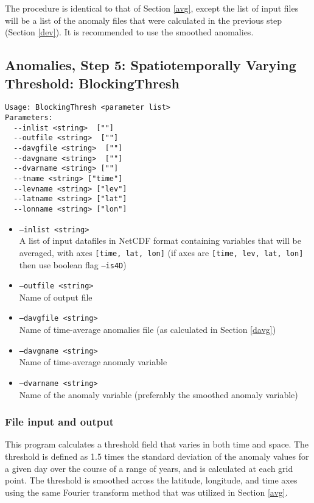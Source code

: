 \documentclass{article}
\begin{document}
The procedure is identical to that of Section \ref{avg}, except the list of input files will be a list of the anomaly files that were calculated in the previous step (Section \ref{dev}). It is recommended to use the smoothed anomalies.

\subsection{Anomalies, Step 5: Spatiotemporally Varying Threshold: BlockingThresh}\label{thresh}

\begin{verbatim}
Usage: BlockingThresh <parameter list>
Parameters:
  --inlist <string>  [""]
  --outfile <string>  [""]
  --davgfile <string>  [""]
  --davgname <string>  [""]
  --dvarname <string> [""]
  --tname <string> ["time"]
  --levname <string> ["lev"]
  --latname <string> ["lat"]
  --lonname <string> ["lon"]
\end{verbatim}

\begin{itemize}
\item[]\texttt{--inlist <string>} \\ A list of input datafiles in NetCDF format containing variables that will be averaged, with axes \texttt{[time, lat, lon]} (if axes are \texttt{[time, lev, lat, lon] } then use boolean flag \texttt{--is4D})
\item[]\texttt{--outfile <string>} \\ Name of output file
\item[]\texttt{--davgfile <string>} \\ Name of time-average anomalies file (as calculated in Section \ref{davg})
\item[]\texttt{--davgname <string>} \\ Name of time-average anomaly variable
\item[]\texttt{--dvarname <string>} \\ Name of the anomaly variable (preferably the smoothed anomaly variable)
\end{itemize}

\subsubsection{File input and output}
This program calculates a threshold field that varies in both time and space. The threshold is defined as 1.5 times the standard deviation of the anomaly values for a given day over the course of a range of years, and is calculated at each grid point. The threshold is smoothed across the latitude, longitude, and time axes using the same Fourier transform method that was utilized in Section \ref{avg}.
\end{document}
